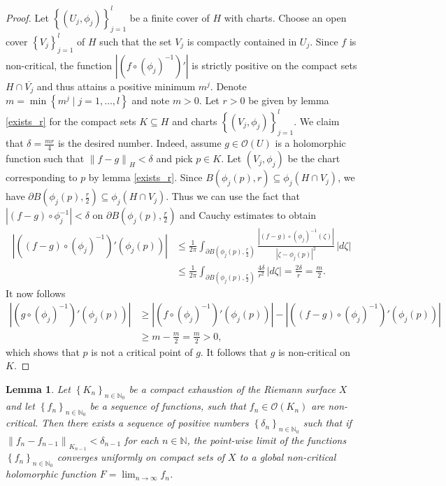 \documentclass[a4paper,11pt]{amsart}
\newcommand{\N}{\mathbb N}
\newcommand{\set}[1]{\left\{#1\right\}}
\newcommand{\abs}[1]{\left|#1\right|}
\newcommand{\norm}[1]{\left\lVert#1\right\rVert}
\newtheorem{lemma}{Lemma}
\begin{document}
\begin{proof}
    Let $\set{(U_j,\phi_j)}_{j=1}^l$ be a finite cover of $H$ with charts. 
    Choose an open cover $\set{V_j}_{j=1}^l$ of $H$ such that the set $V_j$ is compactly contained in $U_j$.
    Since $f$ is non-critical, the function $\abs{(f \circ (\phi_j)^{-1})'}$ is strictly positive on the compact sets $H \cap \overline{V_j}$ and thus attains a positive minimum $m^j$.
    Denote $m = \min \set{m^j \mid j=1, \ldots, l}$ and note $m > 0$.
    Let $r > 0$ be given by lemma \ref{exists_r} for the compact sets $K \subseteq H$ and charts $\set{(V_j,\phi_j)}_{j=1}^l$.
    We claim that $\delta = \frac{mr}{4}$ is the desired number. Indeed, assume $g \in \mathcal{O}(U)$ is a holomorphic function such that $\norm{f-g}_{H} < \delta$ and pick $p \in K$.
    Let $(V_j,\phi_j)$ be the chart corresponding to $p$ by lemma \ref{exists_r}. 
    Since $B(\phi_j(p),r) \subseteq \phi_j(H \cap V_j)$, we have $\partial B\left(\phi_j(p),\frac{r}{2}\right) \subseteq \phi_j(H \cap V_j)$.
    Thus we can use the fact that $\abs{(f - g) \circ \phi_j^{-1}} < \delta$ on $\partial B\left(\phi_j(p),\frac{r}{2}\right)$ and Cauchy estimates to obtain
    \begin{align*}
        \abs{((f-g) \circ (\phi_j)^{-1})'(\phi_j(p))} &\le \frac{1}{2\pi} \int_{\partial B\left(\phi_j(p),\frac{r}{2}\right)} \frac{\abs{(f-g) \circ (\phi_j)^{-1}(\zeta)}}{\abs{\zeta - \phi_j(p)}^2} \, \abs{d \zeta} \\
        &\le \frac{1}{2\pi} \int_{\partial B\left(\phi_j(p),\frac{r}{2}\right)} \frac{4\delta}{r^2}\, \abs{d \zeta} =\frac{2\delta}{r} = \frac{m}{2}. 
    \end{align*}
    It now follows
    \begin{align*}
    \abs{(g \circ (\phi_j)^{-1})'(\phi_j(p))} &\ge \abs{(f \circ (\phi_j)^{-1})'(\phi_j(p))} - \abs{((f-g) \circ (\phi_j)^{-1})'(\phi_j(p))}\\
    &\ge m - \frac{m}{2} = \frac{m}{2} > 0,
    \end{align*}
    which shows that $p$ is not a critical point of $g$. It follows that $g$ is non-critical on $K$.
\end{proof}

\begin{lemma} \label{appox_lemma}
    Let $\set{K_n}_{n \in \N_0}$ be a compact exhaustion of the Riemann surface $X$ and let $\set{f_n}_{n \in \N_0}$ be a sequence of functions,
    such that $f_n \in \mathcal{O}(K_n)$ are non-critical. Then there exists a sequence of positive numbers $\set{\delta_n}_{n \in \N_0}$
    such that if $\norm{f_n-f_{n-1}}_{K_{n-1}} < \delta_{n-1}$ for each $n \in \N$, 
    the point-wise limit of the functions $\set{f_n}_{n \in \N_0}$ converges uniformly on compact sets of $X$ to a global non-critical holomorphic function $F = \lim_{n \to \infty} f_n$.
\end{lemma}
\end{document}
